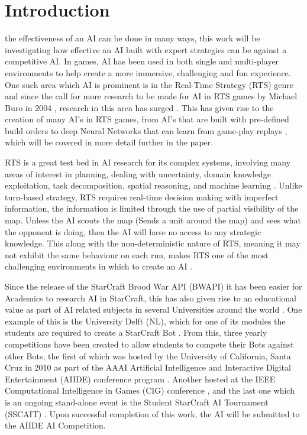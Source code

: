 \documentclass[journal]{IEEEtran}
\begin{document}
	\section{Introduction}
	 the effectiveness of an AI can be done in many ways, this work will be investigating how effective an AI built with expert strategies can be against a competitive AI. %
	In games, AI has been used in both single and multi-player environments to help create a more immersive, challenging and fun experience. One such area which AI is prominent is in the Real-Time Strategy (RTS) genre and since the call for more research to be made for AI in RTS games by Michael Buro in 2004 \cite{CallFor}, research in this area has surged \cite{Survey}. This has given rise to the creation of many AI's in RTS games, from AI's that are built with pre-defined build orders \cite{Swen} to deep Neural Networks that can learn from game-play replays \cite{Deep}, which will be covered in more detail further in the paper.
	
	RTS is a great test bed in AI research for its complex systems, involving many areas of interest in planning, dealing with uncertainty, domain knowledge exploitation, task decomposition, spatial reasoning, and machine learning \cite{StarCraftBot}. Unlike turn-based strategy, RTS requires real-time decision making with imperfect information, the information is limited through the use of partial visibility of the map. Unless the AI scouts the map (Sends a unit around the map) and sees what the opponent is doing, then the AI will have no access to any strategic knowledge. This along with the non-deterministic nature of RTS, meaning it may not exhibit the same behaviour on each run, makes RTS one of the most challenging environments in which to create an AI \cite{Current}.
	
	Since the release of the StarCraft Brood War API (BWAPI) it has been easier for Academics to research AI in StarCraft, this has also given rise to an educational value as part of AI related subjects in several Universities around the world \cite{Current}. One example of this is the University Delft (NL), which for one of its modules the students are required to create a StarCraft Bot \cite{NL}. From this, three yearly competitions have been created to allow students to compete their Bots against other Bots, the first of which was hosted by the University of California, Santa Cruz in 2010 as part of the AAAI Artificial Intelligence and Interactive Digital Entertainment (AIIDE) conference program \cite{AIIDE}. Another hosted at the IEEE Computational Intelligence in Games (CIG) conference \cite{CIG}, and the last one which is an ongoing stand-alone event is the Student StarCraft AI Tournament (SSCAIT) \cite{StarCraftBot}. Upon successful completion of this work, the AI will be submitted to the AIIDE AI Competition.
	
\end{document}
